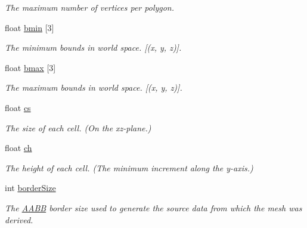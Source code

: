 \begin{DoxyCompactItemize}
\begin{DoxyCompactList}\small\item\em The maximum number of vertices per polygon. \end{DoxyCompactList}\item 
\mbox{\label{structrcPolyMesh_ae7486964a6d65c79df1ef35edb38363f}} 
float \hyperlink{structrcPolyMesh_ae7486964a6d65c79df1ef35edb38363f}{bmin} \mbox{[}3\mbox{]}
\begin{DoxyCompactList}\small\item\em The minimum bounds in world space. \mbox{[}(x, y, z)\mbox{]}. \end{DoxyCompactList}\item 
\mbox{\label{structrcPolyMesh_ad36c5c68d491f0118330974576c35b7c}} 
float \hyperlink{structrcPolyMesh_ad36c5c68d491f0118330974576c35b7c}{bmax} \mbox{[}3\mbox{]}
\begin{DoxyCompactList}\small\item\em The maximum bounds in world space. \mbox{[}(x, y, z)\mbox{]}. \end{DoxyCompactList}\item 
\mbox{\label{structrcPolyMesh_a4c3ca520c55f96037cffcf6a92809563}} 
float \hyperlink{structrcPolyMesh_a4c3ca520c55f96037cffcf6a92809563}{cs}
\begin{DoxyCompactList}\small\item\em The size of each cell. (On the xz-\/plane.) \end{DoxyCompactList}\item 
\mbox{\label{structrcPolyMesh_aa1ba795ddbb893da041b2a5273716ac5}} 
float \hyperlink{structrcPolyMesh_aa1ba795ddbb893da041b2a5273716ac5}{ch}
\begin{DoxyCompactList}\small\item\em The height of each cell. (The minimum increment along the y-\/axis.) \end{DoxyCompactList}\item 
\mbox{\label{structrcPolyMesh_a9f367a88b878ce8029b9709fb27b878b}} 
int \hyperlink{structrcPolyMesh_a9f367a88b878ce8029b9709fb27b878b}{border\+Size}
\begin{DoxyCompactList}\small\item\em The \hyperlink{classAABB}{A\+A\+BB} border size used to generate the source data from which the mesh was derived. \end{DoxyCompactList}\end{DoxyCompactItemize}


